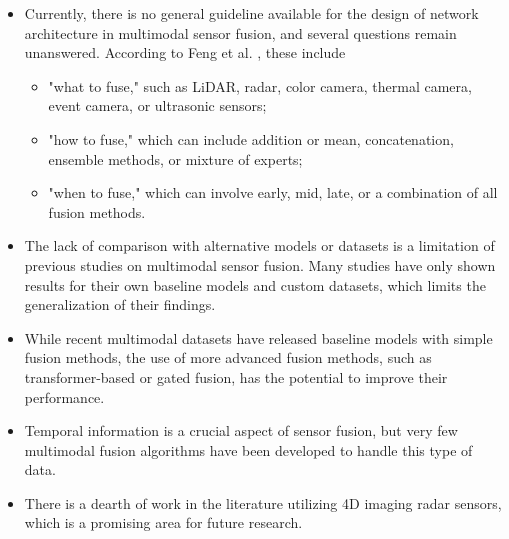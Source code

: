 \documentclass[rnd]{mas_proposal}
\begin{document}
\begin{itemize}
      \item Currently, there is no general guideline available for the design of network architecture in multimodal sensor fusion, and several questions remain unanswered. According to Feng et al. \cite{feng2020deep}, these include 
      \begin{itemize}
            \item "what to fuse," such as LiDAR, radar, color camera, thermal camera, event camera, or ultrasonic sensors; 
            \item "how to fuse," which can include addition or mean, concatenation, ensemble methods, or mixture of experts; 
            \item "when to fuse," which can involve early, mid, late, or a combination of all fusion methods.
      \end{itemize}

      \item The lack of comparison with alternative models or datasets is a limitation of previous studies on multimodal sensor fusion. Many studies have only shown results for their own baseline models and custom datasets, which limits the generalization of their findings.
      
      \item While recent multimodal datasets have released baseline models with simple fusion methods, the use of more advanced fusion methods, such as transformer-based or gated fusion, has the potential to improve their performance.

      \item Temporal information is a crucial aspect of sensor fusion, but very few multimodal fusion algorithms have been developed to handle this type of data. \cite{bijelic2020seeing}

      \item There is a dearth of work in the literature utilizing 4D imaging radar sensors, which is a promising area for future research. \cite{Zhou2022May}



\end{itemize}
\end{document}
